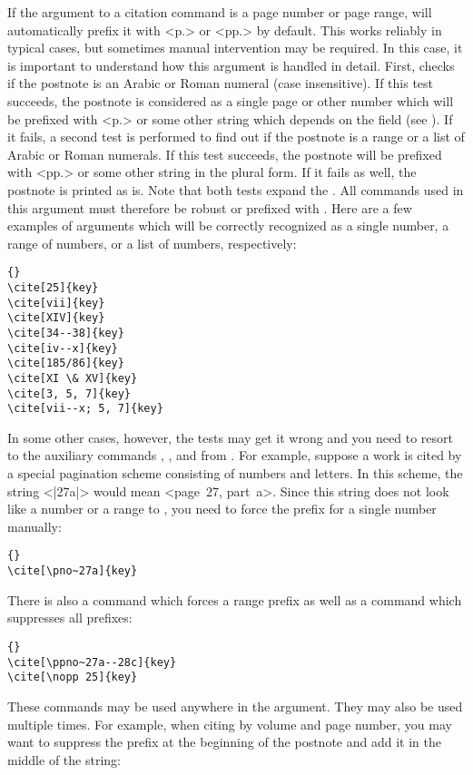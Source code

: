If the  argument to a citation command is a page number or page range, \biblatex will automatically prefix it with <p.> or <pp.> by default. This works reliably in typical cases, but sometimes manual intervention may be required. In this case, it is important to understand how this argument is handled in detail. First, \biblatex checks if the postnote is an Arabic or Roman numeral (case insensitive). If this test succeeds, the postnote is considered as a single page or other number which will be prefixed with <p.> or some other string which depends on the  field (see ). If it fails, a second test is performed to find out if the postnote is a range or a list of Arabic or Roman numerals. If this test succeeds, the postnote will be prefixed with <pp.> or some other string in the plural form. If it fails as well, the postnote is printed as is. Note that both tests expand the . All commands used in this argument must therefore be robust or prefixed with . Here are a few examples of  arguments which will be correctly recognized as a single number, a range of numbers, or a list of numbers, respectively:

\begin{lstlisting}[style=latex]{}
\cite[25]{key}
\cite[vii]{key}
\cite[XIV]{key}
\cite[34--38]{key}
\cite[iv--x]{key}
\cite[185/86]{key}
\cite[XI \& XV]{key}
\cite[3, 5, 7]{key}
\cite[vii--x; 5, 7]{key}
\end{lstlisting}
%
In some other cases, however, the tests may get it wrong and you need to resort to the auxiliary commands , , and  from . For example, suppose a work is cited by a special pagination scheme consisting of numbers and letters. In this scheme, the string <|27a|> would mean <page~27, part~a>. Since this string does not look like a number or a range to \biblatex, you need to force the prefix for a single number manually:

\begin{lstlisting}[style=latex]{}
\cite[\pno~27a]{key}
\end{lstlisting}
%
There is also a  command which forces a range prefix as well as a  command which suppresses all prefixes:

\begin{lstlisting}[style=latex]{}
\cite[\ppno~27a--28c]{key}
\cite[\nopp 25]{key}
\end{lstlisting}
%
These commands may be used anywhere in the  argument. They may also be used multiple times. For example, when citing by volume and page number, you may want to suppress the prefix at the beginning of the postnote and add it in the middle of the string:

